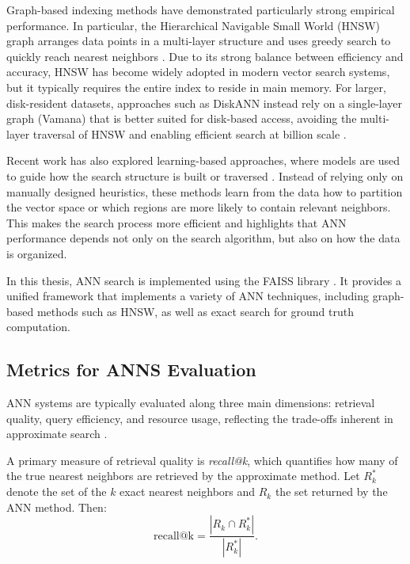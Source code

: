 Graph-based indexing methods have demonstrated particularly strong empirical performance. In particular, the Hierarchical Navigable Small World (HNSW) graph arranges data points in a multi-layer structure and uses greedy search to quickly reach nearest neighbors \cite{malkov2018efficientrobustapproximatenearest}. Due to its strong balance between efficiency and accuracy, HNSW has become widely adopted in modern vector search systems, but it typically requires the entire index to reside in main memory. For larger, disk-resident datasets, approaches such as DiskANN instead rely on a single-layer graph (Vamana) that is better suited for disk-based access, avoiding the multi-layer traversal of HNSW and enabling efficient search at billion scale \cite{subramanya2019diskann}.

Recent work has also explored learning-based approaches, where models are used to guide how the search structure is built or traversed \cite{salemohamed2024discoveringdatastructuresnearest, chiu2019learningindexnearestneighbor}. Instead of relying only on manually designed heuristics, these methods learn from the data how to partition the vector space or which regions are more likely to contain relevant neighbors. This makes the search process more efficient and highlights that ANN performance depends not only on the search algorithm, but also on how the data is organized.

In this thesis, ANN search is implemented using the FAISS library \cite{douze2025faisslibrary}. It provides a unified framework that implements a variety of ANN techniques, including graph-based methods such as HNSW, as well as exact search for ground truth computation.

\subsection{Metrics for ANNS Evaluation}\label{subsec:metrics-for-ann}

ANN systems are typically evaluated along three main dimensions: retrieval quality, query efficiency, and resource usage, reflecting the trade-offs inherent in approximate search \cite{johnson2017billionscalesimilaritysearchgpus, douze2025faisslibrary}.

A primary measure of retrieval quality is \textit{recall@k}, which quantifies how many of the true nearest neighbors are retrieved by the approximate method. Let $R_k^*$ denote the set of the $k$ exact nearest neighbors and $R_k$ the set returned by the ANN method. Then:
\[
\text{recall@k} = \frac{|R_k \cap R_k^*|}{|R_k^*|}.
\]

